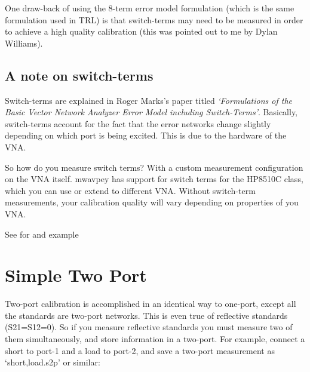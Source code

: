 \documentclass[letterpaper,10pt,english]{sphinxmanual}
\begin{document}
One draw-back of using the 8-term error model formulation (which is the same formulation used in TRL) is that switch-terms may need to be measured in order to achieve a high quality calibration (this was pointed out to me by Dylan Williams).


\subsection{A note on switch-terms}
\label{calibration:a-note-on-switch-terms}
Switch-terms are explained in Roger Marks's paper titled \emph{`Formulations of the Basic Vector Network Analyzer Error Model including Switch-Terms'}. Basically, switch-terms account for the fact that the error networks change slightly depending on which port is being excited. This is due to the hardware of the VNA.

So how do you measure switch terms? With a custom measurement configuration on the VNA itself. mwavpey has support for switch terms for the HP8510C class, which you can use or extend to different VNA. Without switch-term measurements, your calibration quality will vary depending on properties of you VNA.

See  for and example


\section{Simple Two Port}
\label{calibration:simple-two-port}
Two-port calibration is accomplished in an identical way to one-port, except all the standards are two-port networks. This is even true of reflective standards (S21=S12=0). So if you measure reflective standards you must measure two of them simultaneously, and store information in a two-port. For example, connect a short to port-1 and a load to port-2, and save a two-port measurement as `short,load.s2p' or similar:
\end{document}
